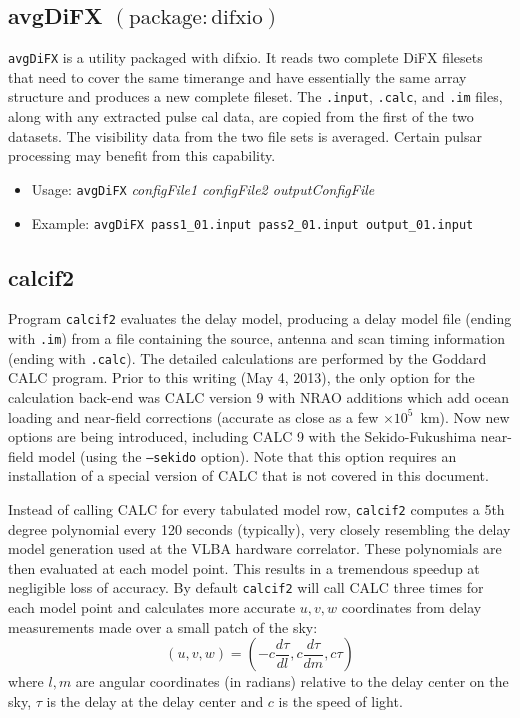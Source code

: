 \subsection{avgDiFX {\small $\mathrm{(package: difxio)}$}} \label{sec:avgDiFX}

{\tt avgDiFX} is a utility packaged with difxio.
It reads two complete DiFX filesets that need to cover the same timerange and have essentially the same array structure and produces a new complete fileset.
The {\tt .input}, {\tt .calc}, and {\tt .im} files, along with any extracted pulse cal data, are copied from the first of the two datasets.
The visibility data from the two file sets is averaged.
Certain pulsar processing may benefit from this capability.

\begin{itemize}
\item[] Usage: {\tt avgDiFX} {\em configFile1 configFile2 outputConfigFile}
\item[] Example: {\tt avgDiFX pass1\_01.input pass2\_01.input output\_01.input} 
\end{itemize}




\subsection{calcif2} \label{sec:calcif2}

Program {\tt calcif2} evaluates the delay model, producing a delay model file (ending with {\tt .im}) from a file containing the source, antenna and scan timing information (ending with {\tt .calc}).
The detailed calculations are performed by the Goddard CALC program.
Prior to this writing (May 4, 2013), the only option for the calculation back-end was CALC version 9 with NRAO additions which add ocean loading and near-field corrections (accurate as close as a few $\times 10^5$~km). 
Now new options are being introduced, including CALC 9 with the Sekido-Fukushima near-field model (using the {\tt --sekido} option).
Note that this option requires an installation of a special version of CALC that is not covered in this document.

Instead of calling CALC for every tabulated model row, {\tt calcif2} computes a 5th degree polynomial every 120 seconds (typically),
very closely resembling the delay model generation used at the VLBA hardware correlator.
These polynomials are then evaluated at each model point.
This results in a tremendous speedup at negligible loss of accuracy.
By default {\tt calcif2} will call CALC three times for each model point and calculates more accurate $u, v, w$ coordinates from delay measurements made over a small patch of the sky:
\begin{equation}
(u, v, w) = \left(-c \frac{d \tau}{d l}, c \frac{d \tau}{d m}, c \tau \right)
\end{equation}
where $l, m$ are angular coordinates (in radians) relative to the delay center on the sky, $\tau$ is the delay at the delay center and $c$ is the speed of light.

